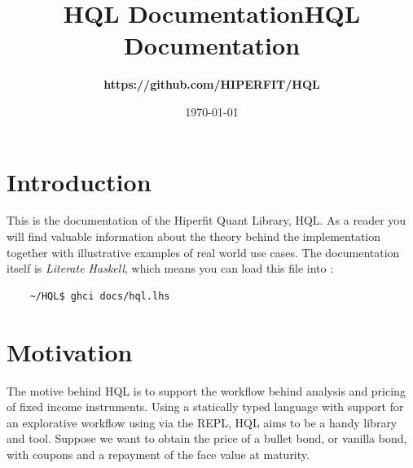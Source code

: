 \documentclass[11pt,a4paper]{article}
\def\Author{
\bf https://github.com/HIPERFIT/HQL
}
\def\Title{\bf HQL Documentation}
\numberwithin{equation}{section}
\begin{document}
\title{HQL Documentation}

\title{\Title}
\author{\Author}
\date{\today}
\maketitle

\tableofcontents

\FrameSep

\newpage


	\section{Introduction}
	This is the documentation of the Hiperfit Quant Library, HQL. As a reader you will
	find valuable information about the theory behind the implementation together with
	illustrative examples of real world use cases. The documentation itself is \textit{Literate Haskell}\cite{LitHaskell},
	which means you can load this file into :

	\FrameSep
	\begin{lstlisting}
	~/HQL$ ghci docs/hql.lhs
	\end{lstlisting}




        \section{Motivation}
        The motive behind HQL is to support the workflow behind analysis and pricing of fixed income instruments.
        Using a statically typed language with support for an explorative workflow using via the REPL, HQL aims to be a handy
        library and tool. Suppose we want to obtain the price of a bullet bond, or vanilla bond, with coupons and a repayment of the face value at maturity.
\end{document}

